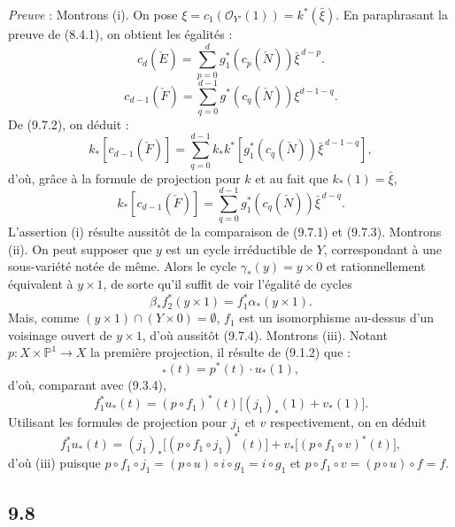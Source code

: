 \emph{Preuve} : Montrons (i). On pose $\xi=c_1(\mathcal{O}_{Y'}(1))=k^*(\bar\xi)$. En paraphrasant la preuve de (8.4.1), on
obtient les égalités :
\[
c_d(\check E)=\sum_{p=0}^d g_1^*(c_p(\check N))\bar\xi^{\,d-p}.
\tag{9.7.1}
\]
\[
c_{d-1}(\check F)=\sum_{q=0}^{d-1}g^*(c_q(\check N))\xi^{d-1-q}.
\tag{9.7.2}
\]
De (9.7.2), on déduit :
\[
k_*[c_{d-1}(\check F)]
=\sum_{q=0}^{d-1}k_*k^*[g_1^*(c_q(\check N))\bar\xi^{\,d-1-q}],
\]
d'où, grâce à la formule de projection pour $k$ et au fait que $k_*(1)=\bar\xi$,
\[
k_*[c_{d-1}(\check F)]=\sum_{q=0}^{d-1}g_1^*(c_q(\check N))\bar\xi^{\,d-q}.
\tag{9.7.3}
\]
L'assertion (i) résulte aussitôt de la comparaison de (9.7.1) et (9.7.3). Montrons (ii). On peut supposer que $y$ est un cycle irréductible de $Y$, correspondant à une sous-variété notée de même. Alors le cycle $\gamma_*(y)=y\times0$ et rationnellement équivalent à $y\times1$, de sorte qu'il suffit de voir l'égalité de cycles
\[
\beta_*f_2^*(y\times1)=f_1^*\alpha_*(y\times1).
\tag{9.7.4}
\]
Mais, comme $(y\times1)\cap(Y\times0)=\emptyset$, $f_1$ est un isomorphisme au-dessus d'un voisinage ouvert de $y\times1$, d'où aussitôt (9.7.4). Montrons (iii). Notant $p:X\times\mathbb{P}^1\to X$ la première projection, il résulte de (9.1.2) que :
\[
{}_*(t)=p^*(t)\cdot u_*(1),
\tag{9.7.5}
\]
d'où, comparant avec (9.3.4),
\[
f_1^*u_*(t)=(p\circ f_1)^*(t)\bigl[(j_1)_*(1)+v_*(1)\bigr].
\tag{9.7.6}
\]
Utilisant les formules de projection pour $j_1$ et $v$ respectivement, on en déduit
\[
f_1^*u_*(t)=(j_1)_*\bigl[(p\circ f_1\circ j_1)^*(t)\bigr]+v_*\bigl[(p\circ f_1\circ v)^*(t)\bigr],
\tag{9.7.7}
\]
d'où (iii) puisque $p\circ f_1\circ j_1=(p\circ u)\circ i\circ g_1=i\circ g_1$ et $p\circ f_1\circ v=(p\circ u)\circ f=f$.

\subsection*{9.8}

